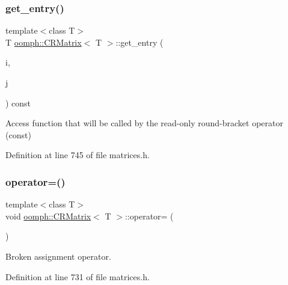 \subsubsection{\texorpdfstring{get\+\_\+entry()}{get\_entry()}}
{\footnotesize\ttfamily template$<$class T$>$ \\
T \hyperlink{classoomph_1_1CRMatrix}{oomph\+::\+C\+R\+Matrix}$<$ T $>$\+::get\+\_\+entry (\begin{DoxyParamCaption}\item[{const unsigned long \&}]{i,  }\item[{const unsigned long \&}]{j }\end{DoxyParamCaption}) const\hspace{0.3cm}{\ttfamily [inline]}}



Access function that will be called by the read-\/only round-\/bracket operator (const) 



Definition at line 745 of file matrices.\+h.

\mbox{\label{classoomph_1_1CRMatrix_ae18692a9988d3635990b1c67a303b6fd}} 
\subsubsection{\texorpdfstring{operator=()}{operator=()}}
{\footnotesize\ttfamily template$<$class T$>$ \\
void \hyperlink{classoomph_1_1CRMatrix}{oomph\+::\+C\+R\+Matrix}$<$ T $>$\+::operator= (\begin{DoxyParamCaption}\item[{const \hyperlink{classoomph_1_1CRMatrix}{C\+R\+Matrix}$<$ T $>$ \&}]{ }\end{DoxyParamCaption})\hspace{0.3cm}{\ttfamily [inline]}}



Broken assignment operator. 



Definition at line 731 of file matrices.\+h.

\mbox{\label{classoomph_1_1CRMatrix_abf764862746afbbe2655a41bdf726327}} 
